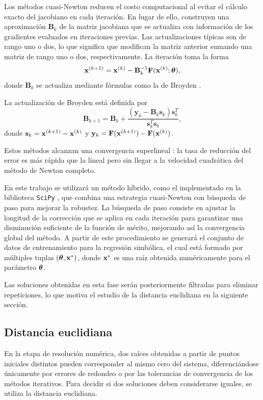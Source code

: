 Los métodos cuasi-Newton \cite{nocedal2006numerical} reducen el costo computacional al evitar el cálculo exacto del jacobiano en cada iteración. En lugar de ello, construyen una aproximación \(\mathbf{B}_k\) de la matriz jacobiana que se actualiza con información de los gradientes evaluados en iteraciones previas. Las actualizaciones típicas son de rango uno o dos, lo que significa que modifican la matriz anterior sumando una matriz de rango uno o dos, respectivamente. La iteración toma la forma \[ \mathbf{x}^{(k+1)} = \mathbf{x}^{(k)} - \mathbf{B}_k^{-1} \mathbf{F}(\mathbf{x}^{(k)}; \boldsymbol{\theta}), \] donde \(\mathbf{B}_k\) se actualiza mediante fórmulas como la de Broyden \cite{broyden1965class}.

La actualización de Broyden está definida por \[ \mathbf{B}_{k+1} = \mathbf{B}_k + \frac{(\mathbf{y}_k - \mathbf{B}_k \mathbf{s}_k) \mathbf{s}_k^T} {\mathbf{s}_k^T \mathbf{s}_k}, \] donde \(\mathbf{s}_k = \mathbf{x}^{(k+1)} - \mathbf{x}^{(k)}\) y \(\mathbf{y}_k = \mathbf{F}(\mathbf{x}^{(k+1)}) - \mathbf{F}(\mathbf{x}^{(k)})\).

Estos métodos alcanzan una convergencia superlineal \cite{nocedal2006numerical}: la tasa de reducción del error es más rápida que la lineal pero sin llegar a la velocidad cuadrática del método de Newton completo.

En este trabajo se utilizará un método híbrido, como el implementado en la biblioteca \texttt{SciPy} \cite{virtanen2020scipy}, que combina una estrategia cuasi-Newton con búsqueda de paso para mejorar la robustez. La búsqueda de paso consiste en ajustar la longitud de la corrección que se aplica en cada iteración para garantizar una disminución suficiente de la función de mérito, mejorando así la convergencia global del método. A partir de este procedimiento se generará el conjunto de datos de entrenamiento para la regresión simbólica, el cual está formado por múltiples tuplas \((\boldsymbol{\theta}, \mathbf{x}^*)\), donde \(\mathbf{x}^*\) es una raíz obtenida numéricamente para el parámetro \(\boldsymbol{\theta}\).

Las soluciones obtenidas en esta fase serán posteriormente filtradas para eliminar repeticiones, lo que motiva el estudio de la distancia euclidiana en la siguiente sección.

\subsection{Distancia euclidiana}

En la etapa de resolución numérica, dos raíces obtenidas a partir de puntos iniciales distintos pueden corresponder al mismo cero del sistema, diferenciándose únicamente por errores de redondeo o por las tolerancias de convergencia de los métodos iterativos. Para decidir si dos soluciones deben considerarse iguales, se utiliza la distancia euclidiana.

